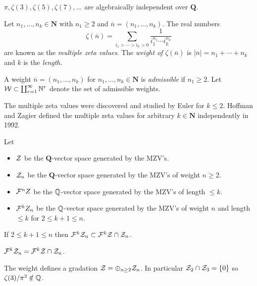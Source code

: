 \begin{conj}
$\pi, \zeta(3), \zeta(5), \zeta(7), \ldots$ are algebraically independent over $\mathbf{Q}$.
\end{conj}


\begin{defn}
Let $n_1, \ldots, n_k \in \mathbf{N}$ with $n_1 \geq 2$ and $\overline{n} = (n_1, \ldots, n_k)$. The real numbers
\[
\zeta(\overline{n}) = \sum_{i_1 > \cdots > i_k > 0} \frac{1}{i_1^{n_1} \cdots i_k^{n_k}}
\]
are known as the \emph{multiple zeta values}. The \emph{weight of $\zeta(\overline{n})$} is $|\overline{n}| = n_1 + \cdots + n_k$ and $k$ is the \emph{length}.
\end{defn}

\begin{defn}
A weight $\overline{n} = (n_1, \ldots, n_k)$ for $n_1, \ldots, n_k \in \mathbf{N}$ is \emph{admissible} if $n_1 \geq 2$. Let $\mathcal{W} \subset \coprod_{r=1}^{\infty} \mathbb{N}^r$ denote the set of admissible weights.
\end{defn}

The multiple zeta values were discovered and studied by Euler for $k \leq 2$. Hoffman and Zagier defined the multiple zeta values for arbitrary $k \in \mathbf{N}$ independently in 1992.

\begin{defn}\label{def:mzvspaces}
Let
\begin{itemize}
\item $\mathcal{Z}$ be the $\mathbf{Q}$-vector space generated by the MZV's.
\item $\mathcal{Z}_n$ be the $\mathbf{Q}$-vector space generated by the MZV's of weight $n \geq 2$.
\item $\mathcal{F}^n Z$ be the $\mathbb{Q}$-vector space generated by the MZV's of length $\leq k$.
\item $\mathcal{F}^k Z_n$ be the $\mathbb{Q}$-vector space generated by the MZV's of weight $n$ and length $\leq k$ for $2 \leq k + 1 \leq n$.
\end{itemize}
\end{defn}

\begin{rem}
If $2 \leq k+1 \leq n$ then $\mathcal{F}^k \mathcal{Z}_n \subset \mathcal{F}^k \mathcal{Z} \cap \mathcal{Z}_n$.
\end{rem}

\begin{conj}
$\mathcal{F}^k \mathcal{Z}_n = \mathcal{F}^k \mathcal{Z} \cap \mathcal{Z}_n$.
\end{conj}

\begin{conj}
The weight defines a gradation $\mathcal{Z} = \oplus_{n \geq 2} \mathcal{Z}_n$. In particular $\mathcal{Z}_2 \cap \mathcal{Z}_3 = \{ 0 \}$ so $\zeta(3) / \pi^2 \notin \mathbb{Q}$.
\end{conj}

